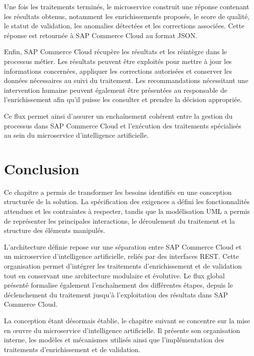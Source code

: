 Une fois les traitements terminés, le microservice construit une réponse contenant les résultats obtenus, notamment les enrichissements proposés, le score de qualité, le statut de validation, les anomalies détectées et les corrections associées. Cette réponse est retournée à SAP Commerce Cloud au format JSON.

Enfin, SAP Commerce Cloud récupère les résultats et les réintègre dans le processus métier. Les résultats peuvent être exploités pour mettre à jour les informations concernées, appliquer les corrections autorisées et conserver les données nécessaires au suivi du traitement. Les recommandations nécessitant une intervention humaine peuvent également être présentées au responsable de l'enrichissement afin qu'il puisse les consulter et prendre la décision appropriée.

Ce flux permet ainsi d'assurer un enchaînement cohérent entre la gestion du processus dans SAP Commerce Cloud et l'exécution des traitements spécialisés au sein du microservice d'intelligence artificielle.
\newpage
\section{Conclusion}

Ce chapitre a permis de transformer les besoins identifiés en une conception structurée de la solution. La spécification des exigences a défini les fonctionnalités attendues et les contraintes à respecter, tandis que la modélisation UML a permis de représenter les principales interactions, le déroulement du traitement et la structure des éléments manipulés.

L'architecture définie repose sur une séparation entre SAP Commerce Cloud et un microservice d'intelligence artificielle, reliés par des interfaces REST. Cette organisation permet d'intégrer les traitements d'enrichissement et de validation tout en conservant une architecture modulaire et évolutive. Le flux global présenté formalise également l'enchaînement des différentes étapes, depuis le déclenchement du traitement jusqu'à l'exploitation des résultats dans SAP Commerce Cloud.

La conception étant désormais établie, le chapitre suivant se concentre sur la mise en œuvre du microservice d'intelligence artificielle. Il présente son organisation interne, les modèles et mécanismes utilisés ainsi que l'implémentation des traitements d'enrichissement et de validation.
